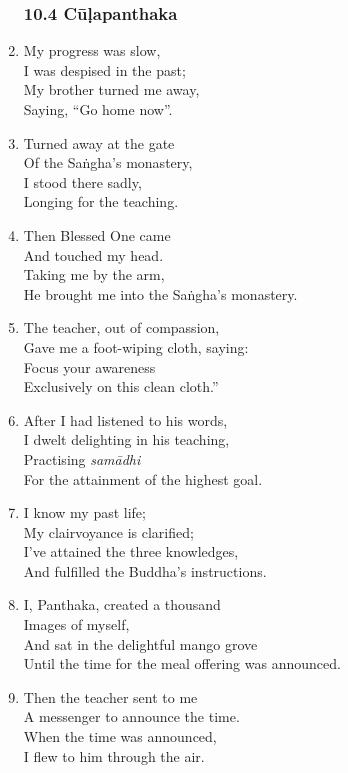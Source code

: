 \documentclass[10pt, openany]{book}
\newcommand*{\vleftofline}[1]{\leavevmode\llap{#1}}
\begin{document}
\begin{enumerate}
\subsubsection*{10.4 Cūḷapanthaka}

\item My progress was slow,\\
I was despised in the past;\\
My brother turned me away,\\
Saying, “Go home now”.

\item Turned away at the gate\\
Of the Saṅgha’s monastery,\\
I stood there sadly,\\
Longing for the teaching.

\item Then Blessed One came\\
And touched my head.\\
Taking me by the arm,\\
He brought me into the Saṅgha’s monastery.

\item The teacher, out of compassion,\\
Gave me a foot-wiping cloth, saying:\\
\vleftofline{“}Focus your awareness \\
Exclusively on this clean cloth.”

\item After I had listened to his words,\\
I dwelt delighting in his teaching,\\
Practising \emph{samādhi}\\
For the attainment of the highest goal.

\item I know my past life;\\
My clairvoyance is clarified;\\
I’ve attained the three knowledges,\\
And fulfilled the Buddha’s instructions.

\item I, Panthaka, created a thousand\\
Images of myself,\\
And sat in the delightful mango grove\\
Until the time for the meal offering was announced.

\item Then the teacher sent to me\\
A messenger to announce the time.\\
When the time was announced,\\
I flew to him through the air.


\end{enumerate}
\end{document}
